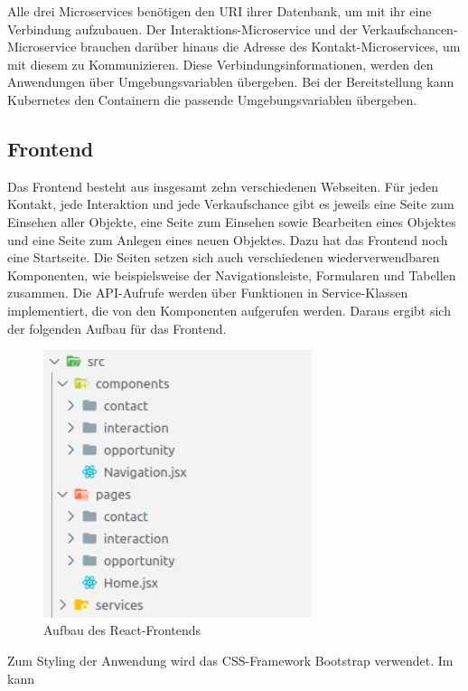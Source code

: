 Alle drei Microservices benötigen den \ac{URI} ihrer Datenbank, um mit ihr eine Verbindung aufzubauen. Der Interaktions-Microservice und der Verkaufschancen-Microservice brauchen darüber hinaus die Adresse des Kontakt-Microservices, um mit diesem zu Kommunizieren. Diese Verbindungsinformationen, werden den Anwendungen über Umgebungsvariablen übergeben. Bei der Bereitstellung kann Kubernetes den Containern die passende Umgebungsvariablen übergeben.

\subsection{Frontend}

Das Frontend besteht aus insgesamt zehn verschiedenen Webseiten. Für jeden Kontakt, jede Interaktion und jede Verkaufschance gibt es jeweils eine Seite zum Einsehen aller Objekte, eine Seite zum Einsehen sowie Bearbeiten eines Objektes und eine Seite zum Anlegen eines neuen Objektes. Dazu hat das Frontend noch eine Startseite. Die Seiten setzen sich auch verschiedenen wiederverwendbaren Komponenten, wie beispielsweise der Navigationsleiste, Formularen und Tabellen zusammen. Die \ac{API}-Aufrufe werden über Funktionen in Service-Klassen implementiert, die von den Komponenten aufgerufen werden. Daraus ergibt sich der folgenden Aufbau für das Frontend.

\begin{figure}[H] 
    \centering
    \includegraphics[width=0.7\textwidth]{figures/AufbauFrontend.png}
    \caption{Aufbau des React-Frontends}
\end{figure}

Zum Styling der Anwendung wird das CSS-Framework Bootstrap verwendet. Im  kann  


